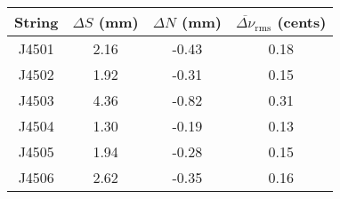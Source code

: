 \begin{tabular}{cccc}
\toprule
String &  $\Delta S$ (mm) &  $\Delta N$ (mm) &  $\overline{\Delta \nu}_\text{rms}$ (cents) \\
\midrule
 J4501 &             2.16 &            -0.43 &                                        0.18 \\
 J4502 &             1.92 &            -0.31 &                                        0.15 \\
 J4503 &             4.36 &            -0.82 &                                        0.31 \\
 J4504 &             1.30 &            -0.19 &                                        0.13 \\
 J4505 &             1.94 &            -0.28 &                                        0.15 \\
 J4506 &             2.62 &            -0.35 &                                        0.16 \\
\bottomrule
\end{tabular}

